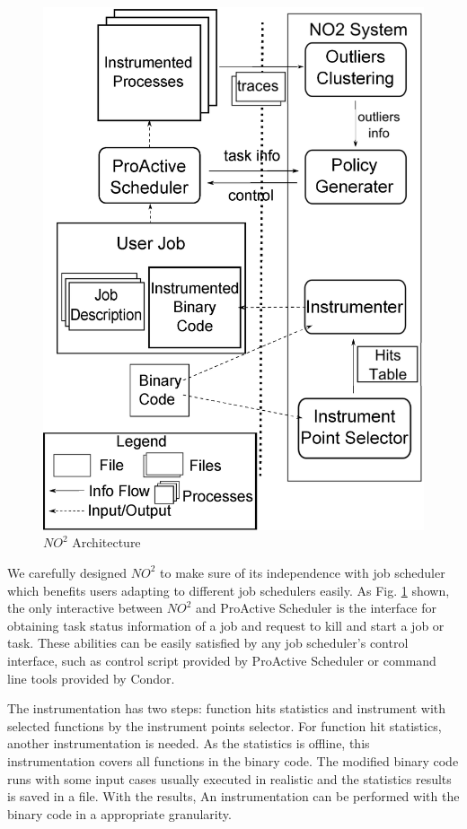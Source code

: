 \begin{figure}
\centering
\includegraphics[width=0.9\columnwidth]{figures/NO2_arch.eps}
\caption{$NO^2$ Architecture}
\label{figure:no2arch}
\end{figure}

We carefully designed $NO^2$ to make sure of its independence with job scheduler which benefits users adapting to different job schedulers easily. As Fig. \ref{figure:no2arch} shown, the only interactive between $NO^2$ and ProActive Scheduler is the interface for obtaining task status information of a job and request to kill and start a job or task. These abilities can be easily satisfied by any job scheduler's control interface, such as control script provided by ProActive Scheduler or command line tools provided by Condor.

The instrumentation has two steps: function hits statistics and instrument with selected functions by the instrument points selector. For function hit statistics, another instrumentation is needed. As the statistics is offline, this instrumentation covers all functions in the binary code. The modified binary code runs with some input cases usually executed in realistic and the statistics results is saved in a file. With the results, An instrumentation can be performed with the binary code in a appropriate granularity.

